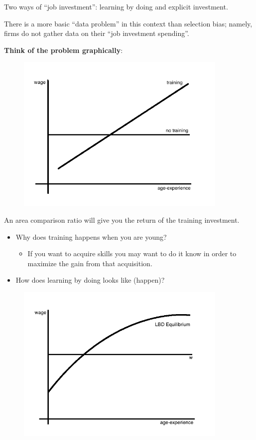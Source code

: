 \documentclass[14pt,notitlepage]{article}
\begin{document}
Two ways of ``job investment'': learning by doing and explicit investment.

There is a more basic ``data problem'' in this context than selection bias; namely, firms do not gather data on their ``job investment spending''.

\textbf{Think of the problem graphically}:

\begin{center}
\begin{figure}[H] 
\caption{}
\centering
\includegraphics[width=4in, height=3in]{plot14.png}
\end{figure}
\end{center}

An area comparison ratio will give you the return of the training investment.
\begin{itemize}
\item Why does training happens when you are young?
    \begin{itemize}
    \item If you want to acquire skills you may want to do it know in order to maximize the gain from that acquisition.
    \end{itemize}
\item How does learning by doing looks like (happen)?
\end{itemize}

\begin{center}
\begin{figure}[H] 
\caption{}
\centering
\includegraphics[width=4in, height=3in]{plot15.png}
\end{figure}
\end{center}
\end{document}
